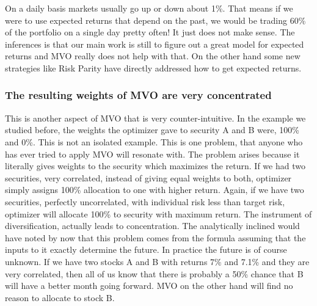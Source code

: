 \documentclass[a4paper]{article}
\begin{document}
On a daily basis markets usually go up or down about 1\%. That means if we were to use expected returns that depend on the past, we would be trading 60\% of the portfolio on a single day pretty often! It just does not make sense. The inferences is that our main work is still to figure out a great model for expected returns and MVO really does not help with that. On the other hand some new strategies like Risk Parity\cite{RP2016} have directly addressed how to get expected returns.


\subsubsection{\label{concentrated-output-allocation}The resulting weights of MVO are very concentrated}
This is another aspect of MVO that is very counter-intuitive. In the example we studied before, the weights the optimizer gave to security A and B were, 100\% and 0\%. This is not an isolated example. This is one problem, that anyone who has ever tried to apply MVO will resonate with. The problem arises because it literally gives weights to the security which maximizes the return. If we had two securities, very correlated, instead of giving equal weights to both, optimizer simply assigns 100\% allocation to one with higher return. Again, if we have two securities, perfectly uncorrelated, with individual risk less than target risk, optimizer will allocate 100\% to security with maximum return. The instrument of diversification, actually leads to concentration. 
The analytically inclined would have noted by now that this problem comes from the formula assuming that the inputs to it exactly determine the future. In practice the future is of course unknown. If we have two stocks A and B with returns 7\% and 7.1\% and they are very correlated, then all of us know that there is probably a 50\% chance that B will have a better month going forward. MVO on the other hand will find no reason to allocate to stock B.
\end{document}
